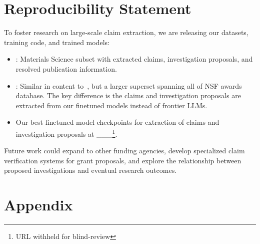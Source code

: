 \documentclass[11pt]{article}
\begin{document}
\section{Reproducibility Statement}
To foster research on large-scale claim extraction, we are releasing our datasets, training code, and trained models:
\begin{itemize}[noitemsep,topsep=0pt]
\item \DatasetNameMatSci: Materials Science subset with extracted claims, investigation proposals, and resolved publication information.
\item \DatasetName: Similar in content to~\DatasetNameMatSci, but a larger superset spanning all of NSF awards database. The key difference is the claims and investigation proposals are extracted from our finetuned models instead of frontier LLMs.
\item Our best finetuned model checkpoints for extraction of claims and investigation proposals at \_\_\_\footnote{URL withheld for blind-review}.
\end{itemize}

Future work could expand to other funding agencies, develop specialized claim verification systems for grant proposals, and explore the relationship between proposed investigations and eventual research outcomes.


%


\section*{Appendix}
\end{document}
